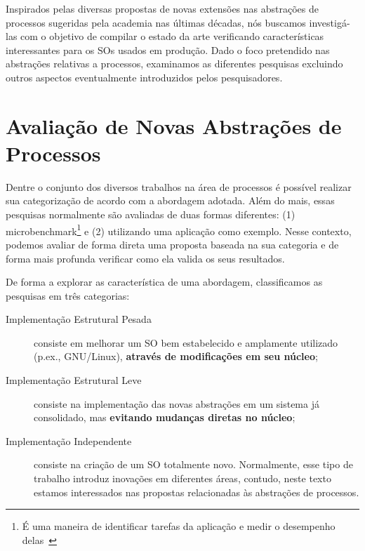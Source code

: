 Inspirados pelas diversas propostas de novas extensões nas abstrações de
processos sugeridas pela academia nas últimas décadas, nós buscamos
investigá-las com o objetivo de compilar o estado da arte verificando
características interessantes para os SOs usados em produção. Dado o foco
pretendido nas abstrações relativas a processos, examinamos as diferentes
pesquisas excluindo outros aspectos eventualmente introduzidos pelos
pesquisadores.

\section{Avaliação de Novas Abstrações de Processos}

Dentre o conjunto dos diversos trabalhos na área de processos é possível
realizar sua categorização de acordo com a abordagem adotada. Além do
mais, essas pesquisas normalmente são avaliadas de duas formas diferentes: (1)
microbenchmark\footnote{É uma maneira de identificar tarefas da aplicação e
medir o desempenho delas~\citep{micro}} e (2) utilizando uma aplicação como
exemplo. Nesse contexto, podemos avaliar de forma direta uma proposta baseada
na sua categoria e de forma mais profunda verificar como ela valida os seus resultados.

De forma a explorar as característica de uma abordagem,
classificamos as pesquisas em três categorias:

\begin{description}
\item [Implementação Estrutural Pesada]

consiste em melhorar um SO bem estabelecido e amplamente utilizado (p.ex.,
GNU/Linux), \textbf{através de modificações em seu núcleo};

\item [Implementação Estrutural Leve]

consiste na implementação das novas abstrações em um sistema já consolidado,
mas \textbf{evitando mudanças diretas no núcleo};

\item [Implementação Independente]

consiste na criação de um SO totalmente novo. Normalmente, esse tipo de
trabalho introduz inovações em diferentes áreas, contudo, neste texto estamos
interessados nas propostas relacionadas às abstrações de processos.

\end{description}

